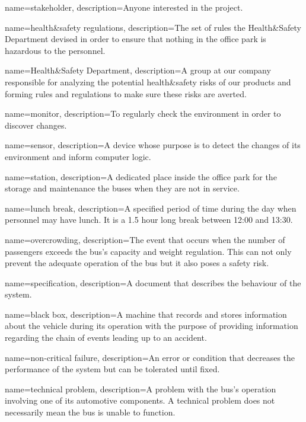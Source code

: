 {%
	name={stakeholder},
	description={Anyone interested in the project.}
}

{%
	name={health\&safety regulations},
	description={The set of rules the Health\&Safety Department devised in
	order to ensure that nothing in the office park is hazardous to the
	personnel.}
}

{%
	name={Health\&Safety Department},
	description={A group at our company responsible for analyzing the
	potential health\&safety risks of our products and forming rules and
	regulations to make sure these risks are averted.}
}

{%
	name={monitor},
	description={To regularly check the environment in order to discover
	changes.}
}

{%
	name={sensor},
	description={A device whose purpose is to detect the changes of its
	environment and inform computer logic.}
}

{%
	name={station},
	description={A dedicated place inside the office park for the storage
	and maintenance the buses when they are not in service.}
}

{%
	name={lunch break},
	description={A specified period of time during the day when personnel
	may have lunch. It is a 1.5 hour long break between 12:00 and 13:30.}
}

{%
	name={overcrowding},
	description={The event that occurs when the number of passengers exceeds
	the bus's capacity and weight regulation. This can not only prevent the
	adequate operation of the bus but it also poses a safety risk.}
}

{%
	name={specification},
	description={A document that describes the behaviour of the system.}
}

{%
	name={black box},
	description={A machine that records and stores information about the
	vehicle during its operation with the purpose of providing information
	regarding the chain of events leading up to an accident.}
}

{%
	name={non-critical failure},
	description={An error or condition that decreases the performance of the
	system but can be tolerated until fixed.}
}

{%
	name={technical problem},
	description={A problem with the bus’s operation involving one of its
	automotive components. A technical problem does not necessarily mean the
	bus is unable to function.}
}

